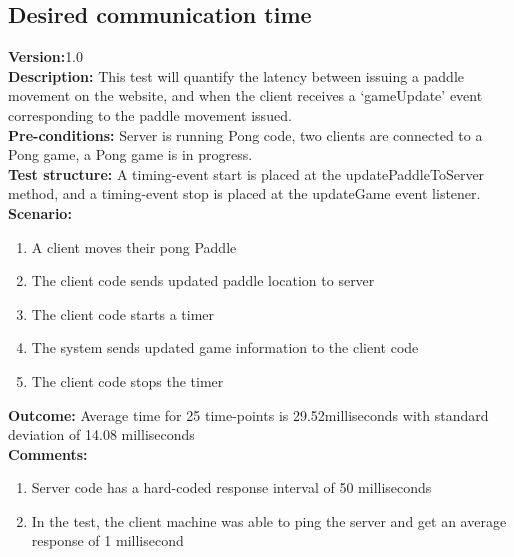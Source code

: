 \documentclass[12pt]{article}
\begin{document}
\subsection{Desired communication time}
\textbf{Version:}1.0\\
\textbf{Description:} This test will quantify the latency between issuing a paddle movement on the website, and when the client receives a ‘gameUpdate’ event corresponding to the paddle movement issued.\\
\textbf{Pre-conditions:} Server is running Pong code, two clients are connected to a Pong game, a Pong game is in progress.\\
\textbf{Test structure:} A timing-event start is placed at the updatePaddleToServer method, and a timing-event stop is placed at the updateGame event listener.\\
\textbf{Scenario:}\\
\begin{enumerate}
    \item A client moves their pong Paddle
    \item The client code sends updated paddle location to server
    \item The client code starts a timer
    \item The system sends updated game information to the client code
    \item The client code stops the timer
\end{enumerate}
\textbf{Outcome:} Average time for 25 time-points is 29.52milliseconds with standard deviation of 14.08 milliseconds\\
\textbf{Comments:}
    \begin{enumerate}
        \item Server code has a hard-coded response interval of 50 milliseconds
        \item In the test, the client machine was able to ping the server and get an average response of 1 millisecond
    \end{enumerate}
\end{document}
